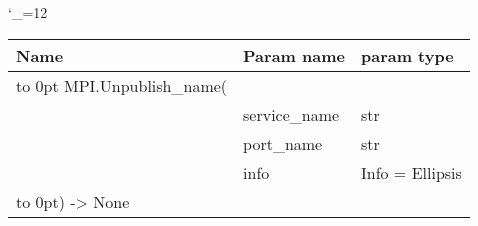 \begingroup \catcode`\_=12 \tt
\begin{tabular}{lll}
\toprule
\textrm{Name}&\textrm{Param name}&\textrm{param type}\\
\midrule
\hbox to 0pt {MPI.Unpublish_name(\hss}\\
& service_name & str\\
& port_name & str\\
& info & Info = Ellipsis\\
\hbox to 0pt{) -> None\hss}\\
\bottomrule
\end{tabular}
\endgroup
